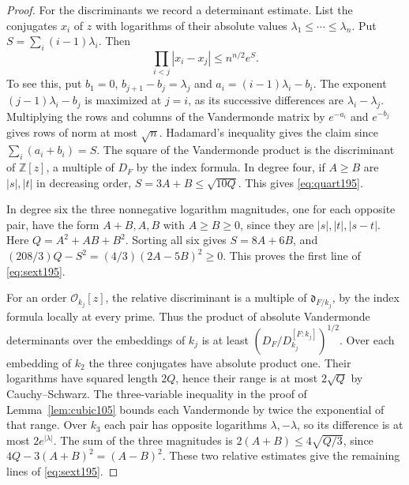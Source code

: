 \documentclass[a4paper,11pt]{article}
\theoremstyle{definition}
\theoremstyle{remark}
\newcommand{\ZZ}{\mathbb Z}\newcommand{\ord}{\operatorname{ord}}
\numberwithin{equation}{section}
\newcommand{\OO}{\mathcal O}
\begin{document}
\begin{proof}
For the discriminants we record a determinant estimate. List the
conjugates \(x_i\) of \(z\) with logarithms of their absolute
values \(\lambda_1\le\cdots\le\lambda_n\). Put
\(S=\sum_i(i-1)\lambda_i\). Then
\[
        \prod_{i<j}|x_i-x_j|\le n^{n/2}e^S .
\]
To see this, put \(b_1=0\), \(b_{j+1}-b_j=\lambda_j\) and
\(a_i=(i-1)\lambda_i-b_i\). The exponent
\((j-1)\lambda_i-b_j\) is maximized at \(j=i\), as its successive
differences are \(\lambda_i-\lambda_j\). Multiplying the rows and
columns of the Vandermonde matrix by \(e^{-a_i}\) and \(e^{-b_j}\)
gives rows of norm at most \(\sqrt n\). Hadamard's inequality
gives the claim since \(\sum_i(a_i+b_i)=S\).
The square of the Vandermonde product is the discriminant of
\(\ZZ[z]\), a multiple of \(D_F\) by the index formula. In degree four, if \(A\ge B\) are
\(|s|,|t|\) in decreasing order, \(S=3A+B\le\sqrt{10Q}\).
This gives \eqref{eq:quart195}.

In degree six the three nonnegative logarithm magnitudes, one
for each opposite pair, have the form \(A+B,A,B\) with
\(A\ge B\ge0\), since they are \(|s|,|t|,|s-t|\). Here
\(Q=A^2+AB+B^2\). Sorting all six gives \(S=8A+6B\), and
\((208/3)Q-S^2=(4/3)(2A-5B)^2\ge0\). This proves the first
line of \eqref{eq:sext195}.

For an order \(\OO_{k_j}[z]\), the relative discriminant is
a multiple of \(\mathfrak d_{F/k_j}\), by the index formula
locally at every prime. Thus the product of absolute
Vandermonde determinants over the embeddings of \(k_j\) is
at least \((D_F/D_{k_j}^{[F:k_j]})^{1/2}\). Over each embedding
of \(k_2\) the three conjugates have absolute product one.
Their logarithms have squared length \(2Q\), hence their range
is at most \(2\sqrt Q\) by Cauchy--Schwarz. The three-variable
inequality in the proof of Lemma~\ref{lem:cubic105} bounds each
Vandermonde by twice the exponential of that range. Over \(k_3\)
each pair has opposite logarithms \(\lambda,-\lambda\), so its
difference is at most \(2e^{|\lambda|}\). The sum of the three
magnitudes is \(2(A+B)\le4\sqrt{Q/3}\), since
\(4Q-3(A+B)^2=(A-B)^2\). These two relative estimates give the
remaining lines of \eqref{eq:sext195}.
\end{proof}
\end{document}
